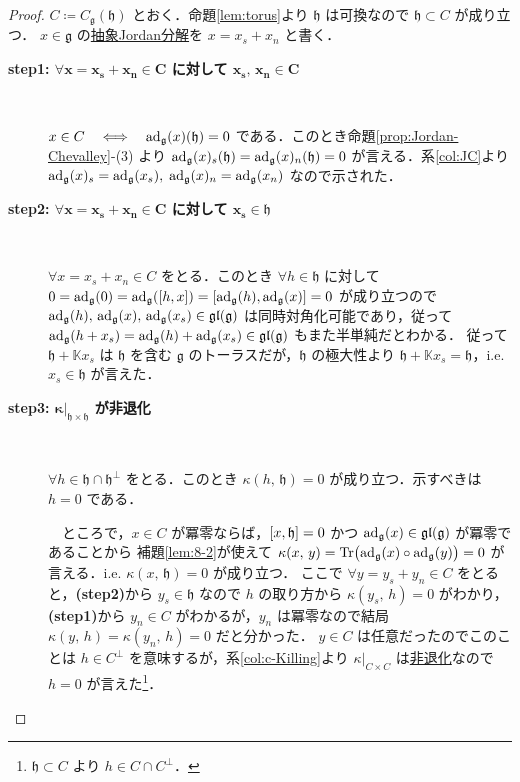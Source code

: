 \documentclass[rep_main]{subfiles}
\begin{document}
\begin{proof}
	$C \coloneqq  C_{\mathfrak{g}}(\mathfrak{h})$ とおく．命題\ref{lem:torus}より $\mathfrak{h}$ は可換なので $\mathfrak{h} \subset C$ が成り立つ．
	$x \in \mathfrak{g}$ の\hyperref[def:abstruct-JC]{抽象Jordan分解}を $x = x_s + x_n$ と書く．
	\begin{description}
		\item[\textbf{step1: $\bm{\forall x = x_s + x_n \in C}$ に対して $\bm{x_s},\, \bm{x_n \in C}$}]　
		
		$x \in C \quad \Longleftrightarrow \quad \operatorname{ad}_{\mathfrak{g}}(x)(\mathfrak{h}) = 0$ である．このとき命題\ref{prop:Jordan-Chevalley}-(3) より $\operatorname{ad}_{\mathfrak{g}}(x)_s(\mathfrak{h}) = \operatorname{ad}_{\mathfrak{g}}(x)_n(\mathfrak{h}) = 0$ が言える．系\ref{col:JC}より $\operatorname{ad}_{\mathfrak{g}}(x)_s = \operatorname{ad}_{\mathfrak{g}}(x_s),\; \operatorname{ad}_{\mathfrak{g}}(x)_n = \operatorname{ad}_{\mathfrak{g}}(x_n)$ なので示された．
		
		\item[\textbf{step2: $\bm{\forall x = x_s + x_n \in C}$ に対して $\bm{x_s \in \mathfrak{h}}$}]　
		
		$\forall x = x_s + x_n \in C$ をとる．このとき $\forall h \in \mathfrak{h}$ に対して $0 = \ad_{\mathfrak{g}}(0) = \ad_{\mathfrak{g}}(\comm{h}{x}) = \comm{\ad_{\mathfrak{g}}(h)}{\ad_{\mathfrak{g}}(x)} = 0$ が成り立つので $\operatorname{ad}_{\mathfrak{g}}(h),\, \operatorname{ad}_{\mathfrak{g}}(x),\,  \operatorname{ad}_{\mathfrak{g}}(x_s) \in \mathfrak{gl}(\mathfrak{g})$ は同時対角化可能であり，従って $\operatorname{ad}_{\mathfrak{g}}(h+x_s) = \operatorname{ad}_{\mathfrak{g}}(h) + \operatorname{ad}_{\mathfrak{g}}(x_s) \in \mathfrak{gl}(\mathfrak{g})$ もまた半単純だとわかる．
		従って $\mathfrak{h} + \mathbb{K}x_s$ は $\mathfrak{h}$ を含む $\mathfrak{g}$ のトーラスだが，$\mathfrak{h}$ の極大性より $\mathfrak{h} + \mathbb{K} x_s = \mathfrak{h}$，i.e. $x_s \in \mathfrak{h}$ が言えた．

		\item[\textbf{step3: $\bm{\kappa}|_{\bm{\mathfrak{h} \times \mathfrak{h}}}$ が非退化}]　
		
		$\forall h \in \mathfrak{h} \cap \mathfrak{h}^\perp$ をとる．このとき $\kappa(h,\, \mathfrak{h}) = 0$ が成り立つ．示すべきは $h = 0$ である．

		　ところで，$x \in C$ が冪零ならば，$\comm{x}{\mathfrak{h}} = 0$ かつ $\operatorname{ad}_{\mathfrak{g}}(x) \in \mathfrak{gl}(\mathfrak{g})$ が冪零であることから
		補題\ref{lem:8-2}が使えて $\kappa(x,\, y) = \Tr \bigl( \operatorname{ad}_{\mathfrak{g}}(x) \circ \operatorname{ad}_{\mathfrak{g}}(y) \bigr) = 0$ が言える．i.e. $\kappa(x,\, \mathfrak{h}) = 0$ が成り立つ．
		ここで $\forall y = y_s + y_n \in C$ をとると，\textsf{\textbf{(step2)}}から $y_s \in \mathfrak{h}$ なので $h$ の取り方から $\kappa(y_s,\, h) = 0$ がわかり，\textsf{\textbf{(step1)}}から $y_n \in C$ がわかるが，$y_n$ は冪零なので結局 $\kappa(y,\, h) = \kappa(y_n,\, h) = 0$ だと分かった．
		$y \in C$ は任意だったのでこのことは $h \in C^\perp$ を意味するが，系\ref{col:c-Killing}より $\kappa|_{C \times C}$ は\hyperref[def:radical-bilinear]{非退化}なので $h = 0$ が言えた\footnote{$\mathfrak{h} \subset C$ より $h \in C \cap C^\perp$．}．
		

\end{description}
\end{proof}
\end{document}
